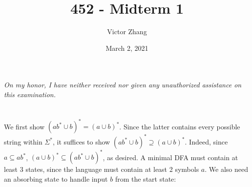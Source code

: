 \documentclass{article}
\title{452 - Midterm 1}
\author{Victor Zhang}
\date{March 2, 2021}
\begin{document}
\maketitle

\section{}
\textit{On my honor, I have neither received nor given any unauthorized assistance on this examination.}

\section{}
We first show $(ab^* \cup b)^* = (a \cup b)^*$. Since the latter contains every possible string within $\Sigma^*$, it suffices to show $(ab^* \cup b)^* \supseteq (a \cup b)^*$. Indeed, since $a \subseteq ab^*$, $(a \cup b)^* \subseteq (ab^* \cup b)^*$, as desired. A minimal DFA must contain at least 3 states, since the language must contain at least 2 symbols $a$. We also need an absorbing state to handle input $b$ from the start state:

\end{document}
